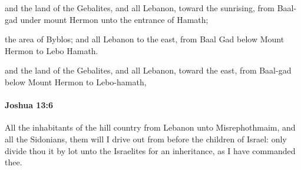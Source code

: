 			\begin{versebox}
					\item[BHS] 
					\item[ASV] and the land of the Gebalites, and all Lebanon, toward the sunrising, from Baal-gad under mount Hermon unto the entrance of Hamath;
					\item[NIV] the area of Byblos; and all Lebanon to the east, from Baal Gad below Mount Hermon to Lebo Hamath.
					\item[NRSV] and the land of the Gebalites, and all Lebanon, toward the east, from Baal-gad below Mount Hermon to Lebo-hamath,
			\end{versebox}

		\paragraph{Joshua 13:6} %
			\label{JOSHUA-13-6}

			All the inhabitants of the hill country from Lebanon unto Misrephothmaim, and all the Sidonians, them will I drive out from before the children of Israel: only divide thou it by lot unto the Israelites for an inheritance, as I have commanded thee.

